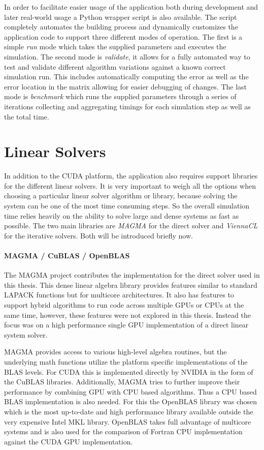 In order to facilitate easier usage of the application both during development and later real-world usage a Python wrapper script is also available. The script completely automates the building process and dynamically customizes the application code to support three different modes of operation. The first is a simple \emph{run} mode which takes the supplied parameters and executes the simulation. The second mode is \emph{validate}, it allows for a fully automated way to test and validate different algorithm variations against a known correct simulation run. This includes automatically computing the error as well as the error location in the matrix allowing for easier debugging of changes. The last mode is \emph{benchmark} which runs the supplied parameters through a series of iterations collecting and aggregating timings for each simulation step as well as the total time.

\section{Linear Solvers}
In addition to the CUDA platform, the application also requires support libraries for the different linear solvers. It is very important to weigh all the options when choosing a particular linear solver algorithm or library, because solving the system can be one of the most time consuming steps. So the overall simulation time relies heavily on the ability to solve large and dense systems as fast as possible. The two main libraries are \emph{MAGMA} for the direct solver and \emph{ViennaCL} for the iterative solvers. Both will be introduced briefly now.

\paragraph{MAGMA / CuBLAS / OpenBLAS}
The MAGMA project contributes the implementation for the direct solver used in this thesis. This dense linear algebra library provides features similar to standard LAPACK functions but for multicore architectures. It also has features to support hybrid algorithms to run code across multiple GPUs or CPUs at the same time, however, these features were not explored in this thesis. Instead the focus was on a high performance single GPU implementation of a direct linear system solver.

MAGMA provides access to various high-level algebra routines, but the underlying math functions utilize the platform specific implementations of the BLAS levels. For CUDA this is implemented directly by NVIDIA in the form of the CuBLAS libraries. Additionally, MAGMA tries to further improve their performance by combining GPU with CPU based algorithms. Thus a CPU based BLAS implementation is also needed. For this the OpenBLAS library was chosen which is the most up-to-date and high performance library available outside the very expensive Intel MKL library. OpenBLAS takes full advantage of multicore systems and is also used for the comparison of Fortran CPU implementation against the CUDA GPU implementation.

